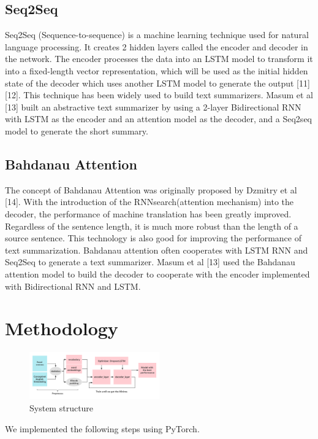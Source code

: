 \documentclass[conference]{IEEEtran}
\begin{document}
\subsection{Seq2Seq}
Seq2Seq (Sequence-to-sequence) is a machine learning technique used for natural language processing. It creates 2 hidden layers called the encoder and decoder in the network. The encoder processes the data into an LSTM model to transform it into a fixed-length vector representation, which will be used as the initial hidden state of the decoder which uses another LSTM model to generate the output [11] [12]. This technique has been widely used to build text summarizers. Masum et al [13] built an abstractive text summarizer by using a 2-layer Bidirectional RNN with LSTM as the encoder and an attention model as the decoder, and a Seq2seq model to generate the short summary.  
\subsection{Bahdanau Attention}
The concept of Bahdanau Attention was originally proposed by Dzmitry et al [14]. With the introduction of the RNNsearch(attention mechanism) into the decoder, the performance of machine translation has been greatly improved. Regardless of the sentence length, it is much more robust than the length of a source sentence. This technology is also good for improving the performance of text summarization. Bahdanau attention often cooperates with LSTM RNN and Seq2Seq to generate a text summarizer. Masum et al [13] used the Bahdanau attention model to build the decoder to cooperate with the encoder implemented with Bidirectional RNN and LSTM.
\section{Methodology}
\begin{figure}[h]
\centering
\includegraphics[width=0.5\textwidth]{imgs/System_Structure.png}
\caption{System structure}
\label{fig:System_Structure}
\end{figure}
\begin{flushleft} 
We implemented the following steps using PyTorch.
\end{flushleft}
\end{document}
